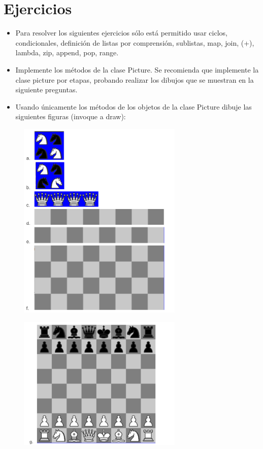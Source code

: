 \documentclass{article}
\begin{document}
	\section{Ejercicios}
	\begin{itemize}
		\item Para resolver los siguientes ejercicios sólo está permitido usar ciclos, condicionales, definición de listas por comprensión, sublistas, map, join, (+), lambda, zip, append, pop, range.
		\item Implemente los métodos de la clase Picture. Se recomienda que implemente la clase picture por etapas, probando realizar los dibujos que se muestran en la siguiente preguntas.
		\item Usando únicamente los métodos de los objetos de la clase Picture dibuje las siguientes figuras (invoque a draw):
	\end{itemize}
	\begin{figure}[H]
		\centering
		\includegraphics[width=0.7\textwidth,keepaspectratio]{img/Ejercicios.png}
	\end{figure}
	\begin{figure}[H]
		\centering
		\includegraphics[width=0.7\textwidth,keepaspectratio]{img/Ejercicio.png}
	\end{figure}
\end{document}
